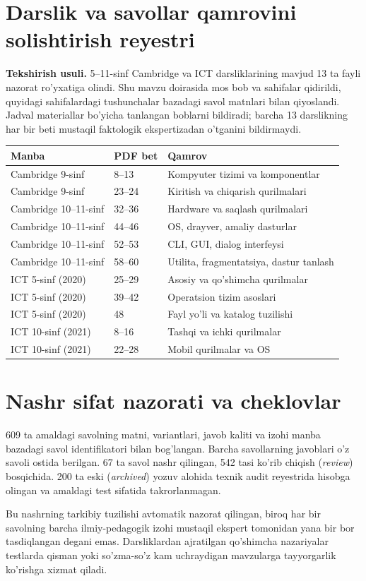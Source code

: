 \documentclass[10pt,a4paper]{article}
\begin{document}
\section{Darslik va savollar qamrovini solishtirish reyestri}
\textbf{Tekshirish usuli.} 5--11-sinf Cambridge va ICT
darsliklarining mavjud 13 ta fayli nazorat ro'yxatiga olindi.
Shu mavzu doirasida mos bob va sahifalar qidirildi, quyidagi
sahifalardagi tushunchalar bazadagi savol matnlari bilan
qiyoslandi. Jadval materiallar bo'yicha tanlangan boblarni
bildiradi; barcha 13 darslikning har bir beti mustaqil
faktologik ekspertizadan o'tganini bildirmaydi.
\begin{center}
\begin{tabular}{@{}p{67mm}p{17mm}p{65mm}@{}}
\hline
\textbf{Manba} & \textbf{PDF bet} & \textbf{Qamrov}\\
\hline
Cambridge 9-sinf & 8--13 & Kompyuter tizimi va komponentlar\\
Cambridge 9-sinf & 23--24 & Kiritish va chiqarish qurilmalari\\
Cambridge 10--11-sinf & 32--36 & Hardware va saqlash qurilmalari\\
Cambridge 10--11-sinf & 44--46 & OS, drayver, amaliy dasturlar\\
Cambridge 10--11-sinf & 52--53 & CLI, GUI, dialog interfeysi\\
Cambridge 10--11-sinf & 58--60 & Utilita, fragmentatsiya, dastur tanlash\\
ICT 5-sinf (2020) & 25--29 & Asosiy va qo'shimcha qurilmalar\\
ICT 5-sinf (2020) & 39--42 & Operatsion tizim asoslari\\
ICT 5-sinf (2020) & 48 & Fayl yo'li va katalog tuzilishi\\
ICT 10-sinf (2021) & 8--16 & Tashqi va ichki qurilmalar\\
ICT 10-sinf (2021) & 22--28 & Mobil qurilmalar va OS\\
\hline
\end{tabular}
\end{center}
\section*{Nashr sifat nazorati va cheklovlar}
609 ta amaldagi savolning matni, variantlari, javob kaliti
va izohi manba bazadagi savol identifikatori bilan bog'langan.
Barcha savollarning javoblari o'z savoli ostida berilgan.
67 ta savol nashr qilingan, 542 tasi ko'rib chiqish
(\textit{review}) bosqichida. 200 ta eski (\textit{archived})
yozuv alohida texnik audit reyestrida hisobga olingan va
amaldagi test sifatida takrorlanmagan.
\par Bu nashrning tarkibiy tuzilishi avtomatik nazorat qilingan,
biroq har bir savolning barcha ilmiy-pedagogik izohi mustaqil
ekspert tomonidan yana bir bor tasdiqlangan degani emas.
Darsliklardan ajratilgan qo'shimcha nazariyalar testlarda
qisman yoki so'zma-so'z kam uchraydigan mavzularga
tayyorgarlik ko'rishga xizmat qiladi.
\end{document}
